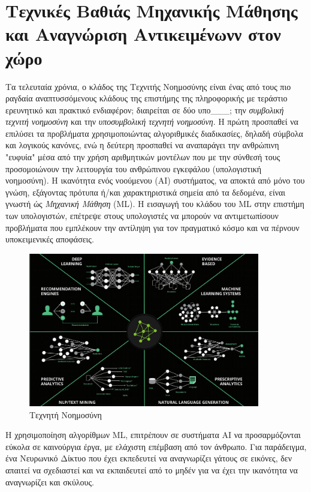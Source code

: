 \chapter{Τεχνικές Βαθιάς Μηχανικής Μάθησης και Αναγνώριση Αντικειμένωνν στον χώρο}
\label{chapter:theory}



Τα τελευταία χρόνια, ο κλάδος της Τεχνιτής Νοημοσύνης είναι ένας από τους πιο ραγδαία
αναπτυσσόμενους κλάδους της επιστήμης της πληροφορικής με τεράστιο
ερευνητικό και πρακτικό ενδιαφέρον; διαιρείται σε δύο υπο\_\_\_; την \emph{συμβολική τεχνιτή
νοημοσύνη} και την \emph{υποσυμβολική τεχνητή νοημοσύνη}. Η πρώτη προσπαθεί να
επιλύσει τα προβλήματα χρησιμοποιώντας αλγοριθμικές διαδικασίες, δηλαδή
σύμβολα και λογικούς κανόνες, ενώ η δεύτερη προσπαθεί να αναπαράγει την
ανθρώπινη "ευφυία" μέσα από την χρήση αριθμητικών μοντέλων
που με την σύνθεσή τους προσομοιώνουν την λειτουργία του ανθρώπινου εγκεφάλου
(υπολογιστική νοημοσύνη).
Η ικανότητα ενός νοούμενου (AI) συστήματος, να αποκτά από μόνο του γνώση,
εξάγοντας πρότυπα ή/και χαρακτηριστικά σημεία από τα δεδομένα,
είναι γνωστή ώς \emph{Μηχανική Μάθηση} (ML).
Η εισαγωγή του κλάδου του ML στην επιστήμη των υπολογιστών,
επέτρεψε στους υπολογιστές να μπορούν να αντιμετωπίσουν προβλήματα που εμπλέκουν
την αντίληψη για τον πραγματικό κόσμο και να πέρνουν υποκειμενικές αποφάσεις.
\begin{figure}[H]
  \centering
  \includegraphics[width=0.9\textwidth]{./images/chapter3/AI_1.jpg}
  \caption[Τεχνητή Νοημοσύνη]{Τεχνητή Νοημοσύνη}
  \label{fig:AI_1}
\end{figure}
Η χρησιμοποίηση αλγορίθμων ML, επιτρέπουν σε συστήματα AI
να προσαρμόζονται εύκολα σε καινούργια έργα, με ελάχιστη επέμβαση από τον άνθρωπο.
Για παράδειγμα, ένα Νευρωνικό Δίκτυο που έχει εκπεδευτεί να αναγνωρίζει γάτους σε εικόνες,
δεν απαιτεί να σχεδιαστεί και να εκπαιδευτεί από το μηδέν για να έχει την ικανότητα
να αναγνωρίζει και σκύλους.

